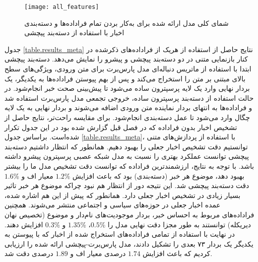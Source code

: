 \begin{figure}[!t]
	\texttt{[image: all\_features]}
	\centering
	\caption{شمای کلی مدل ارائه شده برای به‌کار بردن تمام فراداده‌ها و دسته‌بندی اخبار با استفاده از دسته‌بند پیچشی}
	\label{fig.all_features}
\end{figure}

جدول \ref{table.results_meta} نتایج حاصل از استفاده از هریک از فراداده‌های ذکرشده در کنار بازنمایی متنی  در دو دسته‌بند پیچشی و پیشرو را نمایش می‌دهد. دسته‌بند پیچشی ابتدا با استفاده از ماتریس دنباله‌ای مدل پارس‌برت برای متن ورودی، ویژگی‌های سطح بالای مبتنی بر متن را استخراج می‌کند و پس از بهم پیوستن فراداده‌ها به یکدیگر، یک بردار نهایی وارد یک لایه پرسپترون ساده می‌شود تا پیش‌بینی صحت خبر انجام‌شود. در حالت استفاده از دسته‌بند پرسپترون ساده، خروجی تجمعی مدل پارس‌برت استفاده شد و فراداده‌ها به انتها‌ی بردار نماینده متن ورودی اضافه‌ می‌شوند و بردار نهایی به یک لایه چگال وارد می‌شود تا عمل دسته‌بندی انجام‌شود. برای مقایسه راحت‌تر، نتایج حاصل از تشخیص اخبار بدون فراداده که در فصل قبل گزارش شده بود در این جدول تکرار شده‌است.
براساس جدول \ref{table.results_meta}، با استفاده از پردازش‌های متنی توانستیم دقت تشخیص اخبار جعلی را بهبود دهیم. همانطور که انتظار داشتیم دسته‌بند پیچشی توانست عملکرد بهتری را نسبت به مدل شبکه عصبی پرسپترون پیشرو داشته باشد. با توجه به نتایج، ارزشمندترین فراداده که توانست دقت تشخیص مدل ما را بیشتر بهبود دهد، موضوع هر خبر (دسته‌بندی) بود که باعث افزایش \%$1.2$ معیار اف و \%$1.6$ دقت دسته‌بند پیچشی شد. این نتیجه دور از انتظار هم نبود چراکه موضوع هر خبر تاثیر بسیار زیادی در تشخیص اخبار جعلی دارد. همانطور که پیش از این هم اشاره شده، عمده اخبار جعلی در حوزه‌های سیاسی و اجتماعی منتشر می‌شوند. همچنین فراداده‌های مربوط به احساس‌ خبر، بردار موجودیت‌های نام‌د‌ار و موضوع (تخصیص نهان دیریکله) توانستند به طور مجزا دقت نهایی مدل را \%$0.5$، \%$1.35$ و \%$0.3$ افزایش دهند. در نهایت با استفاده از تمامی فراداده‌های استخراج شده از اخبار که با پیوستن به یکدیگر یک بردار ۷۳ بعدی را تشکیل دادند، مدل‌ پارس‌برت-پیچشی ارائه شده را ارزیابی کردیم که باعث افزایش $1.74$ درصدی معیار اف و $1.89$ درصدی دقت شد.

